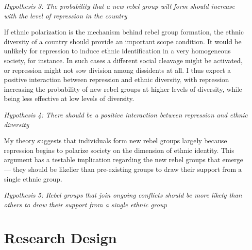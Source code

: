 \documentclass[12pt,]{book}
\theoremstyle{definition}
\theoremstyle{definition}
\theoremstyle{remark}
\begin{document}
\emph{Hypothesis 3: The probability that a new rebel group will form
should increase with the level of repression in the country}

If ethnic polarization is the mechanism behind rebel group formation,
the ethnic diversity of a country should provide an important scope
condition. It would be unlikely for repression to induce ethnic
identification in a very homogeneous society, for instance. In such
cases a different social cleavage might be activated, or repression
might not sow division among dissidents at all. I thus expect a positive
interaction between repression and ethnic diversity, with repression
increasing the probability of new rebel groups at higher levels of
diversity, while being less effective at low levels of diversity.

\emph{Hypothesis 4: There should be a positive interaction between
repression and ethnic diversity}

My theory suggests that individuals form new rebel groups largely
because repression begins to polarize society on the dimension of ethnic
identity. This argument has a testable implication regarding the new
rebel groups that emerge --- they should be likelier than pre-existing
groups to draw their support from a single ethnic group.

\emph{Hypothesis 5: Rebel groups that join ongoing conflicts should be
more likely than others to draw their support from a single ethnic
group}

\section{Research Design}\label{research-design}
\end{document}
